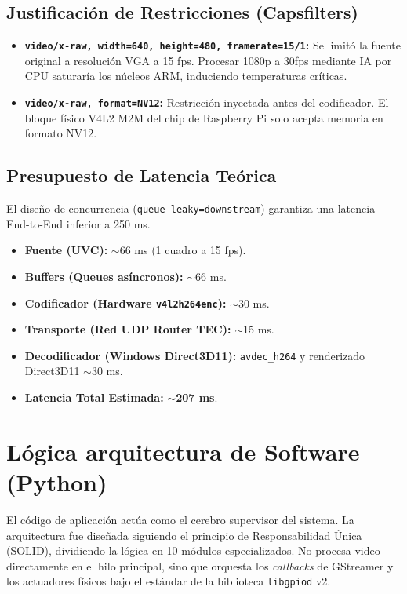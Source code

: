 \documentclass[11pt,a4paper]{article}
\begin{document}
\subsection{Justificación de Restricciones (Capsfilters)}
\begin{itemize}
\item \textbf{\texttt{video/x-raw, width=640, height=480, framerate=15/1}:} Se limitó la fuente original a resolución VGA a 15 fps. Procesar 1080p a 30fps mediante IA por CPU saturaría los núcleos ARM, induciendo temperaturas críticas.
\item \textbf{\texttt{video/x-raw, format=NV12}:} Restricción inyectada antes del codificador. El bloque físico V4L2 M2M del chip de Raspberry Pi solo acepta memoria en formato NV12.
\end{itemize}
\subsection{Presupuesto de Latencia Teórica}
El diseño de concurrencia (\texttt{queue leaky=downstream}) garantiza una latencia End-to-End inferior a 250 ms.
\begin{itemize}
\item \textbf{Fuente (UVC):} $\sim$66 ms (1 cuadro a 15 fps).
\item \textbf{Buffers (Queues asíncronos):} $\sim$66 ms.
\item \textbf{Codificador (Hardware \texttt{v4l2h264enc}):} $\sim$30 ms.
\item \textbf{Transporte (Red UDP Router TEC):} $\sim$15 ms.
\item \textbf{Decodificador (Windows Direct3D11):} \texttt{avdec\_h264} y renderizado Direct3D11 $\sim$30 ms.
\item \textbf{Latencia Total Estimada:} \textbf{$\sim$207 ms}.
\end{itemize}


\section{Lógica arquitectura de Software (Python)}
El código de aplicación actúa como el cerebro supervisor del sistema. La arquitectura fue diseñada siguiendo el principio de Responsabilidad Única (SOLID), dividiendo la lógica en 10 módulos especializados. No procesa video directamente en el hilo principal, sino que orquesta los \textit{callbacks} de GStreamer y los actuadores físicos bajo el estándar de la biblioteca \texttt{libgpiod} v2.
\end{document}
